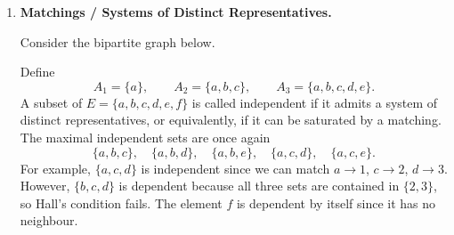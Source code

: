 \documentclass[11pt]{article}
\theoremstyle{plain}
\theoremstyle{definition}
\begin{document}
\begin{enumerate}[label=\textbf{Example \arabic*.}, leftmargin=*, itemsep=1.2ex]
\begin{center}
\end{center}
 
A subset of edges is independent if it contains no cycle.
The maximal independent sets are again
\[
  \{a,b,c\},\quad \{a,b,d\},\quad \{a,b,e\},\quad \{a,c,d\},\quad \{a,c,e\}.
\]
These are precisely the spanning trees of the graph.
For example, $\{a,b,d\}$ is independent, while $\{b,c,d\}$ is dependent
since it forms a cycle.
Any set containing the loop $f$ is dependent.
 
\item \textbf{Matchings / Systems of Distinct Representatives.}
 
Consider the bipartite graph below.
 
\begin{center}
\end{center}
 
Define
\[
  A_1 = \{a\},\qquad A_2 = \{a,b,c\},\qquad A_3 = \{a,b,c,d,e\}.
\]
A subset of $E = \{a,b,c,d,e,f\}$ is called independent if it admits a
system of distinct representatives, or equivalently, if it can be saturated
by a matching.
The maximal independent sets are once again
\[
  \{a,b,c\},\quad \{a,b,d\},\quad \{a,b,e\},\quad \{a,c,d\},\quad \{a,c,e\}.
\]
For example, $\{a,c,d\}$ is independent since we can match
$a \to 1$, $c \to 2$, $d \to 3$.
However, $\{b,c,d\}$ is dependent because all three sets are contained in
$\{2,3\}$, so Hall's condition fails.
The element $f$ is dependent by itself since it has no neighbour.
 
\end{enumerate}
 
\end{document}

